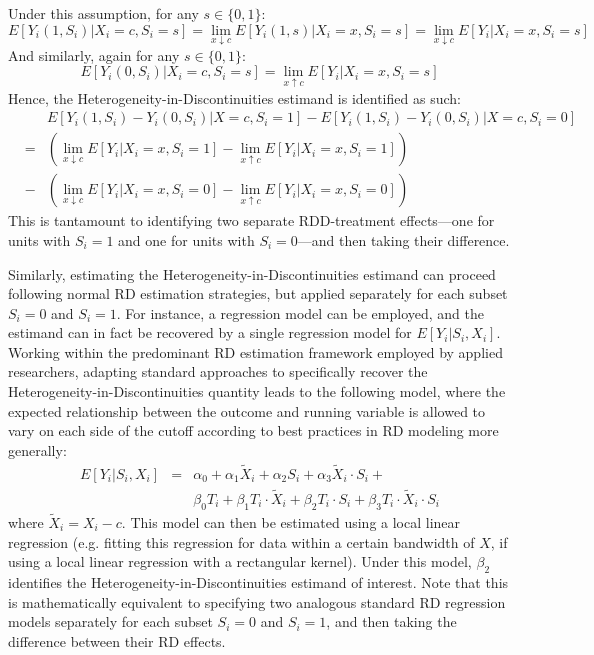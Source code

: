 \documentclass[12pt]{article}
\begin{document}
Under this assumption, for any $s \in \{ 0,1 \}$:
$$E[Y_i(1,S_i) | X_i = c, S_i = s] = \lim_{x \downarrow c} E[Y_i(1,s) | X_i = x, S_i = s] = \lim_{x \downarrow c} E[Y_i | X_i = x, S_i = s]$$
And similarly, again for any $s \in \{ 0,1 \}$:
$$E[Y_i(0,S_i) | X_i = c, S_i = s] = \lim_{x \uparrow c} E[Y_i | X_i = x, S_i = s]$$
Hence, the Heterogeneity-in-Discontinuities estimand is identified as such:
\begin{eqnarray}
& & E[Y_i(1,S_i) - Y_i(0,S_i) | X=c, S_i = 1]  -  E[Y_i(1,S_i) - Y_i(0,S_i) | X=c, S_i = 0] \nonumber \\
& = & \left( \lim_{x \downarrow c} E[Y_i | X_i = x, S_i = 1] - \lim_{x \uparrow c} E[Y_i | X_i = x, S_i = 1] \right) \nonumber  \\
& - & \left( \lim_{x \downarrow c} E[Y_i | X_i = x, S_i = 0] - \lim_{x \uparrow c} E[Y_i | X_i = x, S_i = 0] \right) \label{rdd_diff_ideqn}
\end{eqnarray}
This is tantamount to identifying two separate RDD-treatment effects---one for units with $S_i = 1$ and one for units with $S_i = 0$---and then taking their difference.

Similarly, estimating the Heterogeneity-in-Discontinuities estimand can proceed following normal RD estimation strategies, but applied separately for each subset $S_i=0$ and $S_i=1$. For instance, a regression model can be employed, and the estimand can in fact be recovered by a single regression model for $E[Y_i | S_i, X_i]$. Working within the predominant RD estimation framework employed by applied researchers, adapting standard approaches to specifically recover the Heterogeneity-in-Discontinuities quantity leads to the following model, where the expected relationship between the outcome and running variable is allowed to vary on each side of the cutoff according to best practices in RD modeling more generally:
\begin{eqnarray}
E[Y_i | S_i, X_i] & = & \alpha_0 + \alpha_1 \tilde{X}_i + \alpha_2 S_i + \alpha_3 \tilde{X}_i \cdot S_i + \nonumber \\
& & \beta_0 T_i  + \beta_1 T_i \cdot \tilde{X}_i + \beta_2 T_i \cdot S_i + \beta_3 T_i \cdot \tilde{X}_i \cdot S_i  \nonumber
\end{eqnarray}
where $\tilde{X}_i = X_i - c$. This model can then be estimated using a local linear regression (e.g. fitting this regression for data within a certain bandwidth of $X$, if using a local linear regression with a rectangular kernel). Under this model, $\beta_2$ identifies the Heterogeneity-in-Discontinuities estimand of interest. Note that this is mathematically equivalent to specifying two analogous standard RD regression models separately for each subset $S_i=0$ and $S_i=1$, and then taking the difference between their RD effects.
\end{document}
